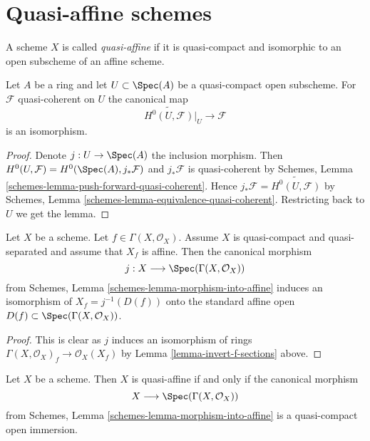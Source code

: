 \section{Quasi-affine schemes}
\label{section-quasi-affine}

\begin{definition}
\label{definition-quasi-affine}
A scheme $X$ is called {\it quasi-affine} if it is quasi-compact
and isomorphic to an open subscheme of an affine scheme.
\end{definition}

\begin{lemma}
\label{lemma-quasi-coherent-quasi-affine}
Let $A$ be a ring and let $U \subset \Spec(A)$ be a quasi-compact
open subscheme. For $\mathcal{F}$ quasi-coherent on $U$ the canonical map
$$
\widetilde{H^0(U, \mathcal{F})}|_U \to \mathcal{F}
$$
is an isomorphism.
\end{lemma}

\begin{proof}
Denote $j : U \to \Spec(A)$ the inclusion morphism. Then
$H^0(U, \mathcal{F}) = H^0(\Spec(A), j_*\mathcal{F})$ and
$j_*\mathcal{F}$ is quasi-coherent by
Schemes, Lemma \ref{schemes-lemma-push-forward-quasi-coherent}.
Hence $j_*\mathcal{F} = \widetilde{H^0(U, \mathcal{F})}$ by
Schemes, Lemma \ref{schemes-lemma-equivalence-quasi-coherent}.
Restricting back to $U$ we get the lemma.
\end{proof}

\begin{lemma}
\label{lemma-invert-f-affine}
Let $X$ be a scheme. Let $f \in \Gamma(X, \mathcal{O}_X)$.
Assume $X$ is quasi-compact and quasi-separated and assume that
$X_f$ is affine. Then the canonical morphism
$$
j : X \longrightarrow \Spec(\Gamma(X, \mathcal{O}_X))
$$
from Schemes, Lemma \ref{schemes-lemma-morphism-into-affine}
induces an isomorphism of $X_f = j^{-1}(D(f))$ onto the standard affine
open $D(f) \subset \Spec(\Gamma(X, \mathcal{O}_X))$.
\end{lemma}

\begin{proof}
This is clear as $j$ induces an isomorphism of rings
$\Gamma(X, \mathcal{O}_X)_f \to \mathcal{O}_X(X_f)$ by
Lemma \ref{lemma-invert-f-sections} above.
\end{proof}

\begin{lemma}
\label{lemma-quasi-affine}
Let $X$ be a scheme. Then $X$ is quasi-affine if and only if
the canonical morphism
$$
X \longrightarrow \Spec(\Gamma(X, \mathcal{O}_X))
$$
from Schemes, Lemma \ref{schemes-lemma-morphism-into-affine} is
a quasi-compact open immersion.
\end{lemma}

